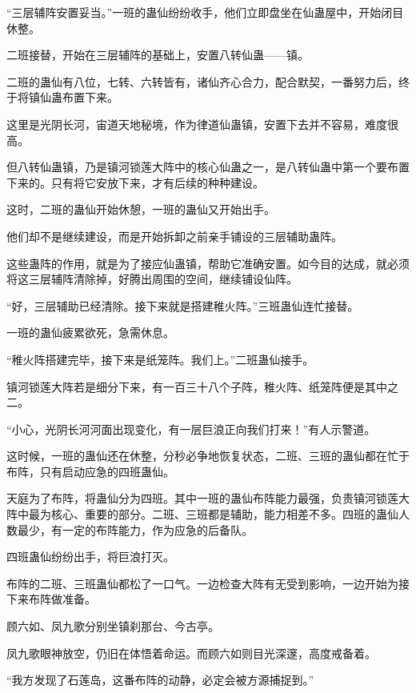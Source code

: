 
\begin{this_body}



“三层辅阵安置妥当。”一班的蛊仙纷纷收手，他们立即盘坐在仙蛊屋中，开始闭目休整。

二班接替，开始在三层辅阵的基础上，安置八转仙蛊——镇。

二班的蛊仙有八位，七转、六转皆有，诸仙齐心合力，配合默契，一番努力后，终于将镇仙蛊布置下来。

这里是光阴长河，宙道天地秘境，作为律道仙蛊镇，安置下去并不容易，难度很高。

但八转仙蛊镇，乃是镇河锁莲大阵中的核心仙蛊之一，是八转仙蛊中第一个要布置下来的。只有将它安放下来，才有后续的种种建设。

这时，二班的蛊仙开始休憩，一班的蛊仙又开始出手。

他们却不是继续建设，而是开始拆卸之前亲手铺设的三层辅助蛊阵。

这些蛊阵的作用，就是为了接应仙蛊镇，帮助它准确安置。如今目的达成，就必须将这三层辅阵清除掉，好腾出周围的空间，继续铺设仙阵。

“好，三层辅助已经清除。接下来就是搭建稚火阵。”三班蛊仙连忙接替。

一班的蛊仙疲累欲死，急需休息。

“稚火阵搭建完毕，接下来是纸笼阵。我们上。”二班蛊仙接手。

镇河锁莲大阵若是细分下来，有一百三十八个子阵，稚火阵、纸笼阵便是其中之二。

“小心，光阴长河河面出现变化，有一层巨浪正向我们打来！”有人示警道。

这时候，一班的蛊仙还在休整，分秒必争地恢复状态，二班、三班的蛊仙都在忙于布阵，只有启动应急的四班蛊仙。

天庭为了布阵，将蛊仙分为四班。其中一班的蛊仙布阵能力最强，负责镇河锁莲大阵中最为核心、重要的部分。二班、三班都是辅助，能力相差不多。四班的蛊仙人数最少，有一定的布阵能力，作为应急的后备队。

四班蛊仙纷纷出手，将巨浪打灭。

布阵的二班、三班蛊仙都松了一口气。一边检查大阵有无受到影响，一边开始为接下来布阵做准备。

顾六如、凤九歌分别坐镇刹那台、今古亭。

凤九歌眼神放空，仍旧在体悟着命运。而顾六如则目光深邃，高度戒备着。

“我方发现了石莲岛，这番布阵的动静，必定会被方源捕捉到。”


\end{this_body}
